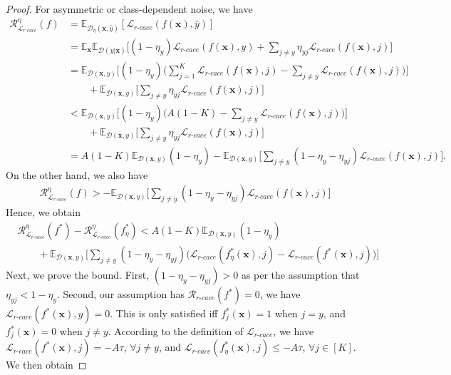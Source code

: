 \documentclass{article}
\begin{document}
\begin{proof}
	For asymmetric or class-dependent noise, we have 
	\begin{align}
		\mathcal{R}_{\mathcal{L}_{r\text{-}cace}}^{\eta}(f) &=\mathbb{E}_{\mathcal{D}_{\eta}(\bm{x},\hat{y})}[\mathcal{L}_{r\textrm{-}cace}(f(\bm{x}),\hat{y})] \nonumber \\
		&= \mathbb{E}_{\bm{x}}\mathbb{E}_{\mathcal{D}(y|\bm{x})}\Big[ (1-\eta_{y})\mathcal{L}_{r\textrm{-}cace}(f(\bm{x}),y) +\sum_{j\ne y}\eta_{yj}\mathcal{L}_{r\textrm{-}cace}(f(\bm{x}),j)\Big] \nonumber \\
		&= \mathbb{E}_{\mathcal{D}(\bm{x},y)}\Big[ (1-\eta_{y})\Big( \sum_{j=1}^{K}\mathcal{L}_{r\textrm{-}cace}(f(\bm{x}),j)  - \sum_{j\ne y}\mathcal{L}_{r\textrm{-}cace}(f(\bm{x}),j) \Big)\Big] \nonumber \\ & \quad \quad +\mathbb{E}_{\mathcal{D}(\bm{x},y)} \Big[\sum_{j\ne y}\eta_{yj}\mathcal{L}_{r\textrm{-}cace}(f(\bm{x}),j)\Big] \nonumber\\
		& <\mathbb{E}_{\mathcal{D}(\bm{x},y)} \Big[ (1-\eta_{y}) \Big( A(1-K) - \sum_{j\ne y}\mathcal{L}_{r\textrm{-}cace}(f(\bm{x}),j)\Big)\Big] \nonumber\\ & \quad \quad +   \mathbb{E}_{\mathcal{D}(\bm{x},y)} \Big[\sum_{j\ne y}\eta_{yj}\mathcal{L}_{r\textrm{-}cace}(f(\bm{x}),j)\Big] \nonumber \\
		&=A(1-K) \mathbb{E}_{\mathcal{D}(\bm{x},y)}(1-\eta_{y}) - \mathbb{E}_{\mathcal{D}(\bm{x},y)} \Big[ \sum_{j\ne y}(1-\eta_{y}-\eta_{yj}) \mathcal{L}_{r\textrm{-}cace}(f(\bm{x}),j) \Big]. \nonumber
	\end{align}
	On the other hand, we also have 
	\begin{align}
		\mathcal{R}_{\mathcal{L}_{r\text{-}cace}}^{\eta}(f) >  - \mathbb{E}_{\mathcal{D}(\bm{x},y)} \Big[ \sum_{j\ne y}(1-\eta_{y}-\eta_{yj}) \mathcal{L}_{r\textrm{-}cace}(f(\bm{x}),j) \Big] \nonumber
	\end{align}
	Hence, we obtain 
	\begin{align}
		&\mathcal{R}_{\mathcal{L}_{r\text{-}cace}}^{\eta}(f^{*}) - \mathcal{R}_{\mathcal{L}_{r\text{-}cace}}^{\eta}(f^{*}_{\eta}) < A(1-K) \mathbb{E}_{\mathcal{D}(\bm{x},y)}(1-\eta_{y})\nonumber  \\ & \quad \quad + \mathbb{E}_{\mathcal{D}(\bm{x},y)} \Big[ \sum_{j\ne y}(1-\eta_{y}-\eta_{yj}) \Big( \mathcal{L}_{r\textrm{-}cace}(f^{*}_{\eta}(\bm{x}),j) - \mathcal{L}_{r\textrm{-}cace}(f^{*}(\bm{x}),j) \Big) \Big] \nonumber
	\end{align}
	Next, we prove the bound. First, $(1-\eta_{y}-\eta_{yj}) > 0 $ as per the assumption that $\eta_{yj} < 1- \eta_{y}$. Second, our assumption has $\mathcal{R}_{r\textrm{-}cace}(f^{*})=0$, we have $\mathcal{L}_{r\textrm{-}cace}(f^{*}(\bm{x}),y)=0$. This is only satisfied iff $f^{*}_{j}(\bm{x})=1$ when $j=y$, and $f^{*}_{j}(\bm{x})=0$ when $j\ne y$. According to the definition of $\mathcal{L}_{r\textrm{-}cace}$, we have $\mathcal{L}_{r\textrm{-}cace}(f^{*}(\bm{x}),j) = -A\tau $, $\forall j\ne y$, and $\mathcal{L}_{r\textrm{-}cace}(f^{*}_{\eta}(\bm{x}),j) \le -A\tau $, $\forall j \in [K]$. We then obtain

\end{proof}
\end{document}
